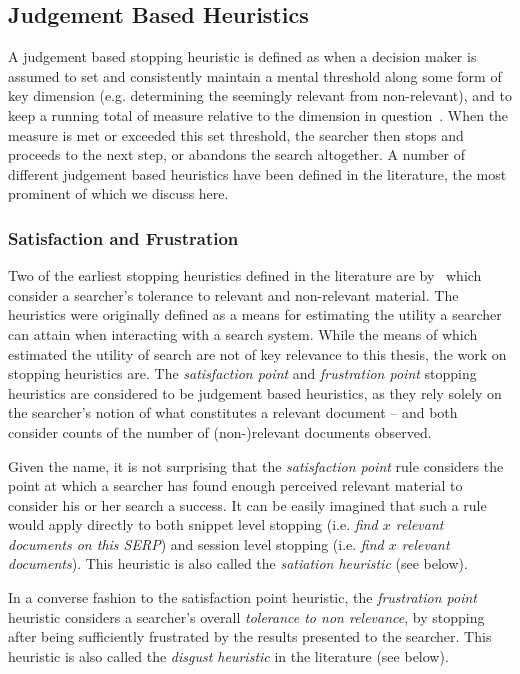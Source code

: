 \subsection{Judgement Based Heuristics}
A judgement based stopping heuristic is defined as when a decision maker is assumed to set and consistently maintain a mental threshold along some form of key dimension (e.g. determining the seemingly relevant from non-relevant), and to keep a running total of measure relative to the dimension in question~\citep{gettys1979hypothesis, nickles1995judgment}. When the measure is met or exceeded this set threshold, the searcher then stops and proceeds to the next step, or abandons the search altogether. A number of different judgement based heuristics have been defined in the literature, the most prominent of which we discuss here.

\subsubsection{Satisfaction and Frustration}
Two of the earliest stopping heuristics defined in the literature are by~\cite{cooper1973retrieval_effectiveness_ii} which consider a searcher's tolerance to relevant and non-relevant material. The heuristics were originally defined as a means for estimating the utility a searcher can attain when interacting with a search system. While the means of which~\cite{cooper1973retrieval_effectiveness_ii} estimated the utility of search are not of key relevance to this thesis, the work on stopping heuristics are. The \emph{satisfaction point} and \emph{frustration point} stopping heuristics are considered to be judgement based heuristics, as they rely solely on the searcher's notion of what constitutes a relevant document -- and both consider counts of the number of (non-)relevant documents observed.

\noindent{}
Given the name, it is not surprising that the \emph{satisfaction point} rule considers the point at which a searcher has found enough perceived relevant material to consider his or her search a success. It can be easily imagined that such a rule would apply directly to both snippet level stopping (i.e. \emph{find $x$ relevant documents on this SERP}) and session level stopping (i.e. \emph{find $x$ relevant documents}). This heuristic is also called the \emph{satiation heuristic} (see below).

\noindent{}
In a converse fashion to the satisfaction point heuristic, the \emph{frustration point} heuristic considers a searcher's overall \emph{tolerance to non relevance}, by stopping after being sufficiently frustrated by the results presented to the searcher. This heuristic is also called the \emph{disgust heuristic} in the literature (see below).

